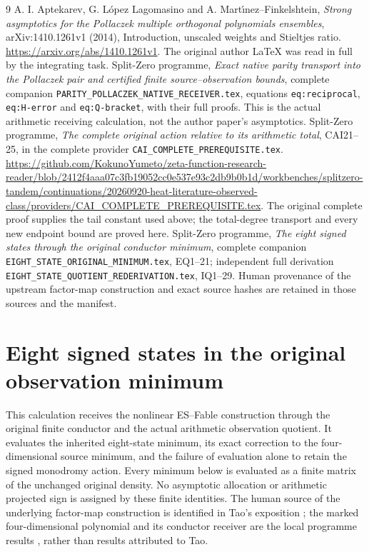 \begin{thebibliography}{9}
 A. I. Aptekarev, G. L\'opez Lagomasino and
A. Mart\'{\i}nez--Finkelshtein, \emph{Strong asymptotics for the
Pollaczek multiple orthogonal polynomials ensembles},
arXiv:1410.1261v1 (2014), Introduction, unscaled weights and
Stieltjes ratio. \url{https://arxiv.org/abs/1410.1261v1}.
The original author LaTeX was read in full by the integrating task.
 Split-Zero programme, \emph{Exact native parity transport
into the Pollaczek pair and certified finite source--observation bounds},
complete companion \texttt{PARITY\_POLLACZEK\_NATIVE\_RECEIVER.tex},
equations \texttt{eq:reciprocal}, \texttt{eq:H-error} and
\texttt{eq:Q-bracket}, with their full proofs. This is the actual
arithmetic receiving calculation, not the author paper's asymptotics.
 Split-Zero programme, \emph{The complete original action
relative to its arithmetic total}, CAI21--25, in the complete provider
\texttt{CAI\_COMPLETE\_PREREQUISITE.tex}.
\url{https://github.com/KokunoYumeto/zeta-function-research-reader/blob/2412f4aaa07c3fb19052cc0e537e93c2db9b0b1d/workbenches/splitzero-tandem/continuations/20260920-heat-literature-observed-class/providers/CAI_COMPLETE_PREREQUISITE.tex}.
The original complete proof supplies the tail constant used above;
the total-degree transport and every new endpoint bound are proved here.
 Split-Zero programme, \emph{The eight signed states
through the original conductor minimum}, complete companion
\texttt{EIGHT\_STATE\_ORIGINAL\_MINIMUM.tex}, EQ1--21; independent
full derivation \texttt{EIGHT\_STATE\_QUOTIENT\_REDERIVATION.tex},
IQ1--29. Human provenance of the upstream factor-map construction
and exact source hashes are retained in those sources and the manifest.
\end{thebibliography}

\endgroup

\clearpage\begingroup
\part*{Eight signed states in the original observation minimum}
\newcommand{\eightminC}{\mathbb C}
\newcommand{\eightminPp}{\mathcal P}
\newcommand{\eightminim}{\operatorname{im}}
\newcommand{\eightminrank}{\operatorname{rank}}
\newcommand{\eightmindiag}{\operatorname{diag}}



This calculation receives the nonlinear ES--Fable construction through
the original finite conductor and the actual arithmetic observation
quotient. It evaluates the inherited eight-state minimum, its exact
correction to the four-dimensional source minimum, and the failure of
evaluation alone to retain the signed monodromy action. Every minimum
below is evaluated as a finite matrix of the unchanged original density.
No asymptotic allocation or arithmetic projected sign is assigned by
these finite identities. The human source of the underlying factor-map
construction is identified in Tao's exposition \cite{eightmin:Tao}; the marked
four-dimensional polynomial and its conductor receiver are the local
programme results \cite{eightmin:FC}, rather than results attributed to Tao.

